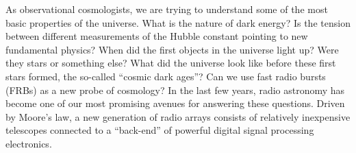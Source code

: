 \documentclass[letterpaper,11pt,preprint]{aastex}
\makeatletter
\def\section{\@startsection {section}{1}{\z@}{1.0ex plus 
1ex minus .2ex}{.2ex plus .2ex}{\large\bf}}
\makeatother
\begin{document}

\singlespace





As observational cosmologists, we are trying to understand some of the
most basic properties of the universe.  What is the nature of dark
energy?  Is the tension between different measurements of the Hubble
constant pointing to new fundamental physics?  When did the first
objects in the universe light up?  Were they stars or something else?
What did the universe look like before these first stars formed, the
so-called ``cosmic dark ages''?  Can we use fast radio bursts (FRBs)
as a new probe of cosmology?  In the last few years, radio astronomy
has become one of our most promising avenues for answering these
questions.  Driven by Moore's law, a new generation of radio arrays
consists of relatively inexpensive telescopes connected to a
``back-end'' of powerful digital signal processing electronics.  
\end{document}
